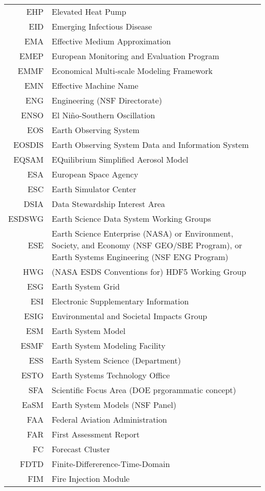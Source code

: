\documentclass[12pt,twoside]{article}
\begin{document}
\begin{longtable}[>{\bfseries}l]{>{\ttfamily}r l}
EHP & Elevated Heat Pump \\
EID & Emerging Infectious Disease \\
EMA & Effective Medium Approximation \\
EMEP & European Monitoring and Evaluation Program \\
EMMF & Economical Multi-scale Modeling Framework \\
EMN & Effective Machine Name \\
ENG & Engineering (NSF Directorate) \\
ENSO & El Ni\~no-Southern Oscillation \\
EOS & Earth Observing System \\
EOSDIS & Earth Observing System Data and Information System \\
EQSAM & EQuilibrium Simplified Aerosol Model \\
ESA & European Space Agency \\
ESC & Earth Simulator Center \\
DSIA & Data Stewardship Interest Area \\
ESDSWG & Earth Science Data System Working Groups \\
ESE & Earth Science Enterprise (NASA) or Environment, Society, and Economy (NSF GEO/SBE Program), or Earth Systems Engineering (NSF ENG Program) \\
HWG & (NASA ESDS Conventions for) HDF5 Working Group \\
ESG & Earth System Grid \\
ESI & Electronic Supplementary Information \\
ESIG & Environmental and Societal Impacts Group \\
ESM & Earth System Model \\
ESMF & Earth System Modeling Facility \\
ESS & Earth System Science (Department) \\
ESTO & Earth Systems Technology Office \\
SFA & Scientific Focus Area (DOE prgorammatic concept) \\
EaSM & Earth System Models (NSF Panel) \\
FAA & Federal Aviation Administration \\
FAR & First Assessment Report \\
FC & Forecast Cluster \\
FDTD & Finite-Differerence-Time-Domain \\
FIM & Fire Injection Module \\

\end{longtable}
\end{document}
